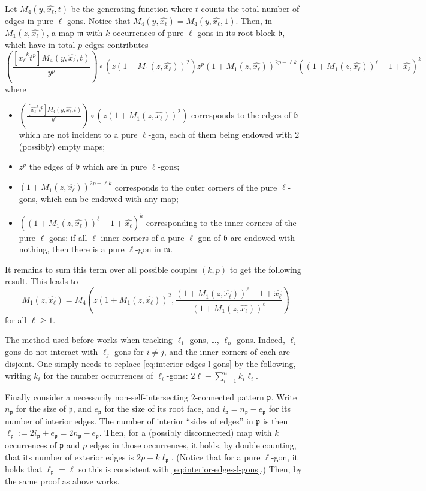 \documentclass[a4paper,UKenglish,cleveref, autoref, thm-restate]{lipics-v2021}
\renewcommand{\(}{\left(}
\renewcommand{\)}{\right)}
\newcommand{\nnsi}{necessarily non-self-intersecting}
\newcommand{\ellgon}{pure \texorpdfstring{$\ell$}{ell}-gon}
\newcommand{\ellgons}{\ellgon s}
\newcommand{\p}{\mathfrak{p}}
\newcommand{\m}{\mathfrak{m}}
\renewcommand{\b}{\mathfrak{b}}
\newcommand{\xface}{x_{\ell}}
\newcommand{\xellgon}{\widehat{\xface}}
\begin{document}
Let ${M_4}(y,\xellgon,t)$ be the generating function where $t$ counts the total number of edges in \ellgons{}. Notice that ${M_4}(y,\xellgon) = {M_4}(y,\xellgon,1)$. Then, in $M_1(z,\xellgon)$, a map $\m$ with $k$ occurrences of \ellgons{} in its root block $\b$, which have in total $p$ edges contributes
\[\(\frac{[\xellgon^k t^p]{M_4}(y,\xellgon,t)}{y^p}\)\circ \(z\(1+{M_1}(z,\xellgon)\)^2\) z^p \(1+{M_1}(z,\xellgon)\)^{2p-\ell k} \(\(1+{M_1}(z,\xellgon)\)^\ell-1 + \xellgon\)^k\]
where
\begin{itemize}
    \item $\(\frac{[\xellgon^k t^p]{M_4}(y,\xellgon,t)}{y^p}\)\circ \(z\(1+{M_1}(z,\xellgon)\)^2\)$ corresponds to the edges of $\b$ which are not incident to a \ellgon, each of them being endowed with $2$ (possibly) empty maps;
    \item $z^p$ the edges of $\b$ which are in \ellgons{};
    \item $\(1+{M_1}(z,\xellgon)\)^{2p-\ell k}$ corresponds to the outer corners of the \ellgons{}, which can be endowed with any map;
    \item $\(\(1+{M_1}(z,\xellgon)\)^\ell-1 + \xellgon\)^k$ corresponding to the inner corners of the \ellgons{}: if all $\ell$ inner corners of a \ellgon{} of $\b$ are endowed with nothing, then there is a \ellgon{} in $\m$.
\end{itemize}
It remains to sum this term over all possible couples $(k,p)$ to get the following result. This leads to
\begin{equation}
\label{eqM1M4rel}
{M_1}(z,\xellgon) = {M_4}\(z\(1+{M_1}(z,\xellgon)\)^2,\frac{\(1+{M_1}(z,\xellgon)\)^\ell-1 + \xellgon}{\(1+{M_1}(z,\xellgon)\)^\ell}\)
\end{equation}
for all $\ell \ge 1$.

The method used before works when tracking $\ell_1$-gons, \dots, $\ell_n$-gons. Indeed, $\ell_i$-gons do not interact with $\ell_j$-gons for $i\neq j$, and the inner corners of each are disjoint. One simply needs to replace \cref{eq:interior-edges-l-gons} by the following, writing $k_i$ for the number occurrences of $\ell_i$-gons:
$2\ell - \sum_{i=1}^n k_i \ell_i$.

Finally consider a \nnsi{} $2$-connected pattern $\p$. Write $n_\p$ for the size of $\p$, and $e_\p$ for the size of its root face, and $i_\p = n_\p - e_\p$ for its number of interior edges. The number of interior ``sides of edges'' in $\p$ is then $\ell_\p := 2 i_\p + e_\p = 2n_\p - e_\p$. Then, for a (possibly disconnected) map with $k$ occurrences of $\p$ and $p$ edges in those occurrences, it holds, by double counting, that its number of exterior edges is $2p - k\ell_\p$. 
(Notice that for a \ellgon, it holds that $\ell_\p =\ell$ so this is consistent with \cref{eq:interior-edges-l-gons}.) Then, by the same proof as above works.
\end{document}

